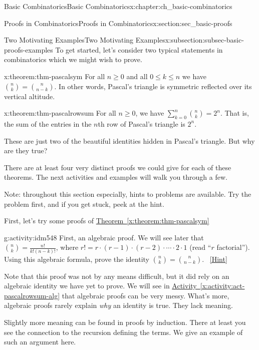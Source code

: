 \documentclass[oneside,10pt,]{book}
\numberwithin{equation}{chapter}
\begin{document}
\begin{chapterptx}{Basic Combinatorics}{}{Basic Combinatorics}{}{}{x:chapter:ch_basic-combinatorics}
\begin{sectionptx}{Proofs in Combinatorics}{}{Proofs in Combinatorics}{}{}{x:section:sec_basic-proofs}
\typeout{************************************************}
%
\begin{subsectionptx}{Two Motivating Examples}{}{Two Motivating Examples}{}{}{x:subsection:subsec-basic-proofs-examples}
To get started, let's consider two typical statements in combinatorics which we might wish to prove.%
\begin{theorem}{}{}{x:theorem:thm-pascalsym}%
For all \(n \ge 0\) and all \(0 \le k \le n\) we have \(\binom{n}{k} = \binom{n}{n-k}\).  In other words, Pascal's triangle is symmetric reflected over its vertical altitude.%
\end{theorem}
\begin{theorem}{}{}{x:theorem:thm-pascalrowsum}%
For all \(n \ge 0\), we have \(\sum_{k=0}^n \binom{n}{k} = 2^n\).  That is, the sum of the entries in the \(n\)th row of Pascal's triangle is \(2^n\).%
\end{theorem}
These are just two of the beautiful identities hidden in Pascal's triangle.  But why are they true?%
\par
There are at least four very distinct proofs we could give for each of these theorems.  The next activities and examples will walk you through a few.%
\par
Note: throughout this section especially, hints to problems are available.  Try the problem first, and if you get stuck, peek at the hint.%
\par
First, let's try some proofs of \hyperref[x:theorem:thm-pascalsym]{Theorem~\ref{x:theorem:thm-pascalsym}}%
\begin{activity}{}{g:activity:idm548}%
First, an algebraic proof.  We will see later that \(\binom{n}{k} = \frac{n!}{k!(n-k)!}\), where \(r! = r \cdot (r-1) \cdot (r-2) \cdot\cdots\cdot 2\cdot 1\) (read ``\(r\) factorial'').  Using this algebraic formula, prove the identity \(\binom{n}{k} = \binom{n}{n-k}\).%
\qquad~\hfill{\tiny\hyperlink{g:hint:idm556-back}{[Hint]}}\end{activity}
Note that this proof was not by any means difficult, but it did rely on an algebraic identity we have yet to prove.  We will see in \hyperref[x:activity:act-pascalrowsum-alg]{Activity~\ref{x:activity:act-pascalrowsum-alg}} that algebraic proofs can be very messy.  What's more, algebraic proofs rarely explain \emph{why} an identity is true.  They lack meaning.%
\par
Slightly more meaning can be found in proofs by induction.  There at least you see the connection to the recursion defining the terms.  We give an example of such an argument here.%

\end{subsectionptx}
\end{sectionptx}
\end{chapterptx}
\end{document}
